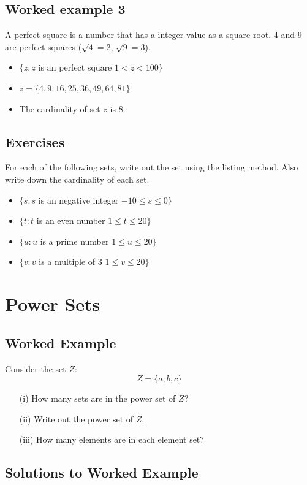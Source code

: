 \documentclass[]{report}
\begin{document}
\begin{enumerate}
\subsection*{Worked example 3}
A perfect square is a number that has a integer value as a
square root. 4 and 9 are perfect squares ($\sqrt{4} = 2$,
$\sqrt{9} = 3$).
\begin{itemize}
\item $\{ z : z $ is an perfect square $ 1 < z < 100 \}$
\item $z = \{4,9,16,25,36,49,64,81\}$
\item The cardinality of set $z$ is 8.
\end{itemize}

\newpage

\subsection*{Exercises}
For each of the following sets, write out the set using the listing method.
Also write down the cardinality of each set.

\begin{itemize} 
\item $\{ s : s $ is an negative integer $ -10 \leq s \leq 0 \}$
\item $\{ t : t $ is an even number $ 1 \leq t \leq 20 \}$
\item $\{ u : u $ is a prime number $ 1 \leq u \leq 20 \}$
\item $\{ v : v $ is a multiple of 3 $ 1 \leq v \leq 20 \}$
\end{itemize}
\newpage
\section*{Power Sets}
\subsection*{Worked Example}
Consider the set $Z$:
\[ Z = \{ a,b,c\}  \]
\begin{itemize}
\item[(i)] How many sets are in the power set of $Z$? 
\item[(ii)] Write out the power set of $Z$. 
\item[(iii)] How many elements are in each element set?
\end{itemize}
\subsection*{Solutions to Worked Example}


\end{enumerate}
\end{document}

